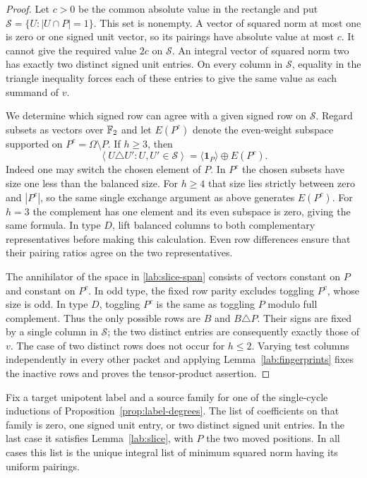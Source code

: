 \begin{proof}
Let $c>0$ be the common absolute value in the rectangle and put
$\mathcal S=\{U:|U\cap P|=1\}$.  This set is nonempty.
A vector of squared norm at most one is zero or one signed unit
vector, so its pairings have absolute value at most $c$.
It cannot give the required value $2c$ on $\mathcal S$.
An integral vector of squared norm two has exactly two distinct
signed unit entries.  On every column in $\mathcal S$, equality
in the triangle inequality forces each of these entries to give
the same value as each summand of $v$.

We determine which signed row can agree with a given signed row
on $\mathcal S$.  Regard subsets as vectors over $\mathbb F_2$ and let
$E(P^c)$ denote the even-weight subspace supported on
$P^c=\Omega\setminus P$.  If $h\ge3$, then
\begin{equation}\label{lab:slice-span}
 \left\langle U\triangle U':U,U'\in\mathcal S\right\rangle
     =\langle\mathbf1_P\rangle\oplus E(P^c).
\end{equation}
Indeed one may switch the chosen element of $P$.  In $P^c$ the
chosen subsets have size one less than the balanced size.  For
$h\ge4$ that size lies strictly between zero and $|P^c|$, so the
same single exchange argument as above generates $E(P^c)$.
For $h=3$ the complement has one element and its even subspace
is zero, giving the same formula.  In type $D$, lift balanced
columns to both complementary representatives before making this
calculation.  Even row differences ensure that their pairing
ratios agree on the two representatives.

The annihilator of the space in \eqref{lab:slice-span} consists
of vectors constant on $P$ and constant on $P^c$.  In odd type,
the fixed row parity excludes toggling $P^c$, whose size is odd.
In type $D$, toggling $P^c$ is the same as toggling $P$ modulo
full complement.  Thus the only possible rows are $B$ and
$B\triangle P$.  Their signs are fixed by a single column in
$\mathcal S$; the two distinct entries are consequently exactly
those of $v$.  The case of two distinct rows does not occur for
$h\le2$.  Varying test columns independently in every other
packet and applying Lemma~\ref{lab:fingerprints} fixes the inactive
rows and proves the tensor-product assertion.
\end{proof}

\begin{lemma}\label{lab:sparse}
Fix a target unipotent label and a source family for one of the
single-cycle inductions of Proposition~\ref{prop:label-degrees}.
The list of coefficients on that family is zero, one signed unit
entry, or two distinct signed unit entries.  In the last case it
satisfies Lemma~\ref{lab:slice}, with $P$ the two moved positions.
In all cases this list is the unique integral list of minimum
squared norm having its uniform pairings.
\end{lemma}

